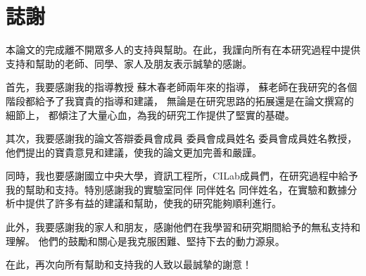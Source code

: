 \documentclass[class=NCU_thesis, crop=false]{standalone}
\begin{document}
\chapter{誌謝}

本論文的完成離不開眾多人的支持與幫助。在此，我謹向所有在本研究過程中提供支持和幫助的老師、同學、家人及朋友表示誠摯的感謝。

首先，我要感謝我的指導教授
蘇木春老師兩年來的指導，
蘇老師在我研究的各個階段都給予了我寶貴的指導和建議，
無論是在研究思路的拓展還是在論文撰寫的細節上，
都傾注了大量心血，為我的研究工作提供了堅實的基礎。

其次，我要感謝我的論文答辯委員會成員
委員會成員姓名
委員會成員姓名教授，他們提出的寶貴意見和建議，使我的論文更加完善和嚴謹。

同時，我也要感謝國立中央大學，資訊工程所，CILab成員們，在研究過程中給予我的幫助和支持。特別感謝我的實驗室同伴
同伴姓名
同伴姓名，在實驗和數據分析中提供了許多有益的建議和幫助，使我的研究能夠順利進行。

此外，我要感謝我的家人和朋友，感謝他們在我學習和研究期間給予的無私支持和理解。
他們的鼓勵和關心是我克服困難、堅持下去的動力源泉。

在此，再次向所有幫助和支持我的人致以最誠摯的謝意！
\end{document}
